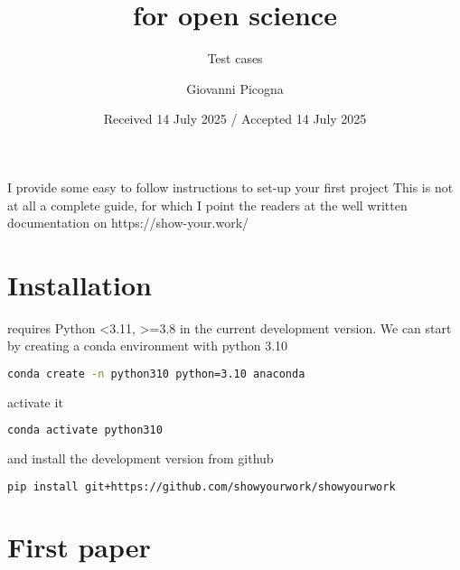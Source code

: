 \documentclass{aa}
\begin{document}
\title{\showyourwork for open science}

\subtitle{Test cases}

\author{Giovanni Picogna}


\date{Received 14 July 2025 / Accepted 14 July 2025}

\abstract {} {I provide some easy to follow instructions to set-up your first \showyourwork project}
{This is not at all a complete guide, for which I point the readers at the well written documentation on https://show-your.work/}
{}{}{}


\maketitle 

\section{Installation}
\label{sec:intro}
\showyourwork requires Python <3.11, >=3.8 in the current development version. We can start by creating a conda environment with python 3.10
  \begin{lstlisting}[language=bash]
    conda create -n python310 python=3.10 anaconda
  \end{lstlisting}
activate it
  \begin{lstlisting}[language=bash]
    conda activate python310
  \end{lstlisting}
and install the development version from github
  \begin{lstlisting}[language=bash]
    pip install git+https://github.com/showyourwork/showyourwork
  \end{lstlisting}

\section{First paper}
\end{document}
